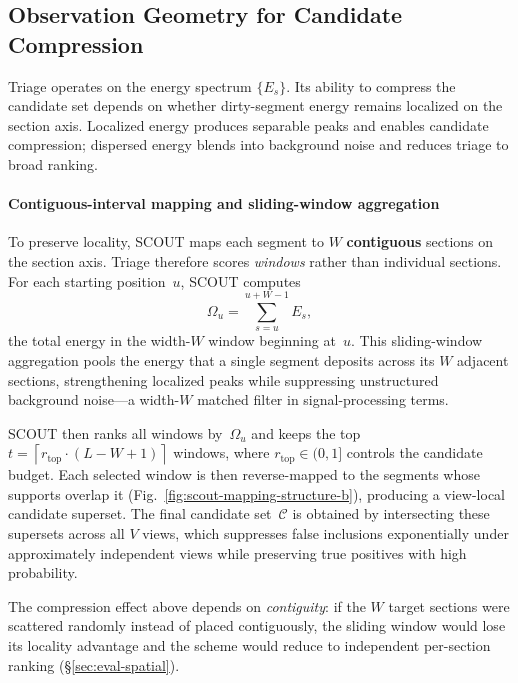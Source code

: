 \subsection{Observation Geometry for Candidate Compression}
\label{sec:spatial-coupling}

Triage operates on the energy spectrum $\{E_s\}$.
Its ability to compress the candidate set depends on whether
dirty-segment energy remains localized on the section axis.
Localized energy produces separable peaks and enables
candidate compression; dispersed energy blends into
background noise and reduces triage to broad ranking.


\paragraph{Contiguous-interval mapping and sliding-window aggregation}
To preserve locality, SCOUT maps each segment to $W$
\textbf{contiguous} sections on the section axis.  Triage
therefore scores \emph{windows} rather than individual
sections.  For each starting position~$u$, SCOUT computes
\[
\Omega_u = \sum_{s=u}^{u+W-1} E_s,
\]
the total energy in the width-$W$ window beginning at~$u$.
This sliding-window aggregation pools the energy that a single
segment deposits across its $W$ adjacent sections, strengthening
localized peaks while suppressing unstructured background
noise---a width-$W$ matched filter in signal-processing terms.

SCOUT then ranks all windows by~$\Omega_u$ and keeps the top
$
t = \left\lceil r_{\mathrm{top}} \cdot (L-W+1) \right\rceil
$
windows, where $r_{\mathrm{top}} \in (0,1]$ controls the
candidate budget. Each selected window is then reverse-mapped
to the segments whose supports overlap it
(Fig.~\ref{fig:scout-mapping-structure-b}), producing a
view-local candidate superset.
The final candidate set~$\mathcal{C}$ is obtained by
intersecting these supersets across all $V$ views, which
suppresses false inclusions exponentially under approximately
independent views while preserving true positives with high
probability.

The compression effect above depends on \emph{contiguity}: if
the $W$ target sections were scattered randomly instead of
placed contiguously, the sliding window would lose its locality
advantage and the scheme would reduce to independent
per-section ranking (\S\ref{sec:eval-spatial}).

